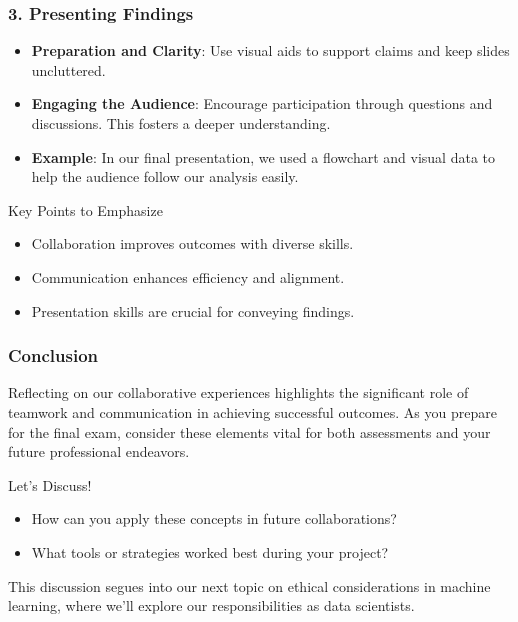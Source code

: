 \documentclass[aspectratio=169]{beamer}
\begin{document}
\begin{frame}[fragile]
    \frametitle{3. Presenting Findings}
    \begin{itemize}
        \item \textbf{Preparation and Clarity}: Use visual aids to support claims and keep slides uncluttered.
        \item \textbf{Engaging the Audience}: Encourage participation through questions and discussions. This fosters a deeper understanding.
        \item \textbf{Example}: In our final presentation, we used a flowchart and visual data to help the audience follow our analysis easily.
    \end{itemize}

    \begin{block}{Key Points to Emphasize}
        \begin{itemize}
            \item Collaboration improves outcomes with diverse skills.
            \item Communication enhances efficiency and alignment.
            \item Presentation skills are crucial for conveying findings.
        \end{itemize}
    \end{block}
\end{frame}

\begin{frame}[fragile]
    \frametitle{Conclusion}
    Reflecting on our collaborative experiences highlights the significant role of teamwork and communication in achieving successful outcomes. As you prepare for the final exam, consider these elements vital for both assessments and your future professional endeavors.

    \begin{block}{Let's Discuss!}
        \begin{itemize}
            \item How can you apply these concepts in future collaborations?
            \item What tools or strategies worked best during your project?
        \end{itemize}
    \end{block}

    This discussion segues into our next topic on ethical considerations in machine learning, where we'll explore our responsibilities as data scientists.
\end{frame}
\end{document}
